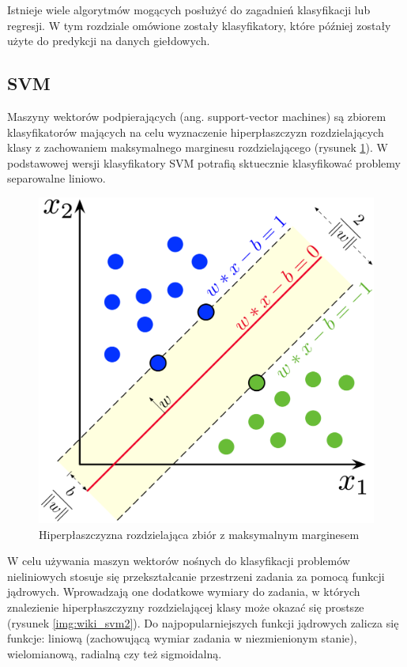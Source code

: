 \documentclass[a4paper, twoside, 11pt, openright]{article}
\begin{document}
Istnieje wiele algorytmów mogących posłużyć do zagadnień klasyfikacji lub regresji. W tym rozdziale omówione zostały klasyfikatory, które później zostały użyte do predykcji na danych giełdowych.

\subsection{SVM \cite{svm}}

Maszyny wektorów podpierających (ang. support-vector machines) są zbiorem klasyfikatorów mających na celu wyznaczenie hiperpłaszczyzn rozdzielających klasy z zachowaniem maksymalnego marginesu rozdzielającego (rysunek \ref{img:wiki_svm}). W podstawowej wersji klasyfikatory SVM potrafią sktuecznie klasyfikować problemy separowalne liniowo.


\begin{figure}[H]
\centering \includegraphics[scale=0.9]{img/svm.png}
\caption{Hiperpłaszczyzna rozdzielająca zbiór z maksymalnym marginesem \cite{wikisvm}}
\label{img:wiki_svm}
\end{figure}

W celu używania maszyn wektorów nośnych do klasyfikacji problemów nieliniowych stosuje się przekształcanie przestrzeni zadania za pomocą funkcji jądrowych. Wprowadzają one dodatkowe wymiary do zadania, w których znalezienie hiperpłaszczyzny rozdzielającej klasy może okazać się prostsze (rysunek \ref{img:wiki_svm2}). Do najpopularniejszych funkcji jądrowych zalicza się funkcje: liniową (zachowującą wymiar zadania w niezmienionym stanie), wielomianową, radialną czy też sigmoidalną.
\end{document}
